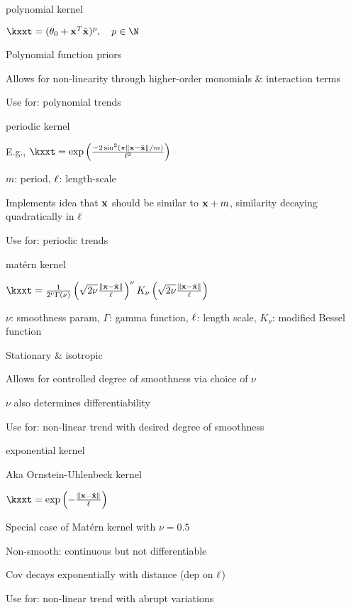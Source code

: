 \documentclass[11pt,compress,t,notes=noshow, xcolor=table]{beamer}
\begin{document}
\begin{framei}{polynomial kernel}
\item $\kxxt = (\theta_0 + \xv^T \xtil )^p, \quad p \in \N$
\item Polynomial function priors
\item Allows for non-linearity through higher-order monomials \& interaction terms
\item Use for: polynomial trends
\end{framei}

\begin{framei}{periodic kernel}
\item E.g., $\kxxt = \exp \left(\frac{-2\sin^2 (\pi \xxtnorm / m)}{\ls^2} \right)$
\item $m$: period, $\ell$: length-scale
\item Implements idea that $\mathbf{x}$ should be similar to $\mathbf{x} + m$, similarity decaying quadratically in $\ell$
\item Use for: periodic trends
\end{framei}

\begin{framei}{matérn kernel}
\item $\kxxt = \frac{1}{2^\nu \Gamma(\nu)} \left( \sqrt{2 \nu} \frac{\xxtnorm}{\ls} \right)^\nu K_\nu \left( \sqrt{2 \nu} \frac{\xxtnorm}{\ls} \right)$
\item $\nu$: smoothness param, $\Gamma$: gamma function, $\ell$: length scale, $K_\nu$: modified Bessel function
\item Stationary \& isotropic
\item Allows for controlled degree of smoothness via choice of $\nu$
\item $\nu$ also determines differentiability
\item Use for: non-linear trend with desired degree of smoothness
\end{framei}

\begin{framei}{exponential kernel}
\item Aka Ornstein-Uhlenbeck kernel
\item $\kxxt = \exp \left(-\frac{\xxtnorm}{\ls} \right)$
\item Special case of Matérn kernel with $\nu = 0.5$
\item Non-smooth: continuous but not differentiable
\item Cov decays exponentially with distance (dep on $\ell$)
\item Use for: non-linear trend with abrupt variations
\end{framei}
\end{document}
